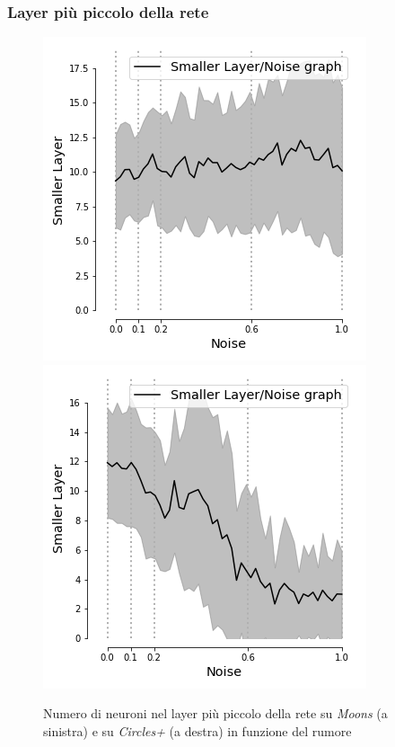 \documentclass{beamer}
\begin{document}
\begin{frame}
 \frametitle{Layer più piccolo della rete }
    \begin{figure}
    \includegraphics[scale = 0.42]{images/small_noise_moons.png}
    \includegraphics[scale = 0.42]{images/small_noise_circles+.png}
    \caption{\large Numero di neuroni nel layer più piccolo della rete su \textit{Moons} (a sinistra) e su \textit{Circles+} (a destra) in funzione del rumore}
 \end{figure}
\end{frame}

\end{document}

